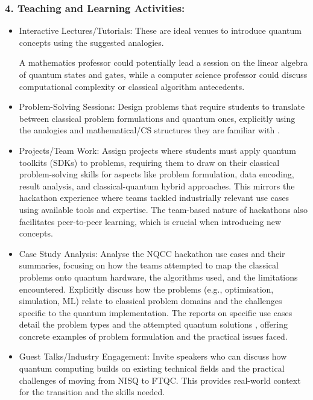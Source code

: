 \documentclass[11pt,a4paper]{article}
\begin{document}
\subsubsection{4. Teaching and Learning Activities:}

\begin{itemize}	
	
\item Interactive Lectures/Tutorials: These are ideal venues to introduce quantum concepts using the suggested analogies. 

A mathematics professor could potentially lead a session on the linear algebra of quantum states and gates, while a computer science professor could discuss computational complexity or classical algorithm antecedents.

\item Problem-Solving Sessions: Design problems that require students to translate between classical problem formulations and quantum ones, explicitly using the analogies and mathematical/CS structures they are familiar with
.

\item Projects/Team Work: Assign projects where students must apply quantum toolkits (SDKs)
to problems, requiring them to draw on their classical problem-solving skills for aspects like problem formulation, data encoding, result analysis, and classical-quantum hybrid approaches. This mirrors the hackathon experience where teams tackled industrially relevant use cases using available tools and expertise. The team-based nature of hackathons
also facilitates peer-to-peer learning, which is crucial when introducing new concepts.

\item Case Study Analysis: Analyse the NQCC hackathon use cases
and their summaries, focusing on how the teams attempted to map the classical problems onto quantum hardware, the algorithms used, and the limitations encountered. Explicitly discuss how the problems (e.g., optimisation, simulation, ML) relate to classical problem domains and the challenges specific to the quantum implementation. The reports on specific use cases detail the problem types and the attempted quantum solutions
, offering concrete examples of problem formulation and the practical issues faced.

\item Guest Talks/Industry Engagement: Invite speakers who can discuss how quantum computing builds on existing technical fields and the practical challenges of moving from NISQ to FTQC. This provides real-world context for the transition and the skills needed.

\end{itemize}	
\end{document}
